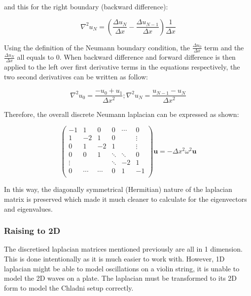 and this for the right boundary (backward difference):

\begin{equation}
    \nabla^2 u_N = (\frac{\Delta u_N}{\Delta x} - \frac{\Delta u_{N-1}}{\Delta x})\frac{1}{\Delta x}
\end{equation}

Using the definition of the Neumann boundary condition, the $\frac{\Delta u_0}{\Delta x}$ term and the $\frac{\Delta u_N}{\Delta x}$ all equals to 0. When backward difference and forward difference is then applied to the left over first derivative terms in the equations respectively, the two second derivatives can be written as follow:

\begin{equation}
    \nabla^2 u_0 = \frac{-u_0 + u_1}{\Delta x^2};
    \nabla^2 u_N = \frac{u_{N-1} - u_N}{\Delta x^2}
\end{equation}

Therefore, the overall discrete Neumann laplacian can be expressed as shown:

\begin{equation}
\begin{pmatrix}
    -1    &     1&     0&     0&\cdots&      0\\
    1     &    -2&     1&     0&      & \vdots\\
    0     &     1&    -2&     1&      & \vdots\\
    0     &     0&     1&\ddots&\ddots&      0\\
    \vdots&      &      &\ddots&    -2&      1\\
    0     &\cdots&\cdots&     0&     1&     -1\\
\end{pmatrix}
\mathbf{u} = -\Delta x^2 \omega^2 \mathbf{u}
\end{equation}

In this way, the diagonally symmetrical (Hermitian) nature of the laplacian matrix is preserved which made it much cleaner to calculate for the eigenvectors and eigenvalues.

\subsubsection{Raising to 2D}
The discretised laplacian matrices mentioned previously are all in 1 dimension. This is done intentionally as it is much easier to work with. However, 1D laplacian might be able to model oscillations on a violin string, it is unable to model the 2D waves on a plate. The laplacian must be transformed to its 2D form to model the Chladni setup correctly. 

